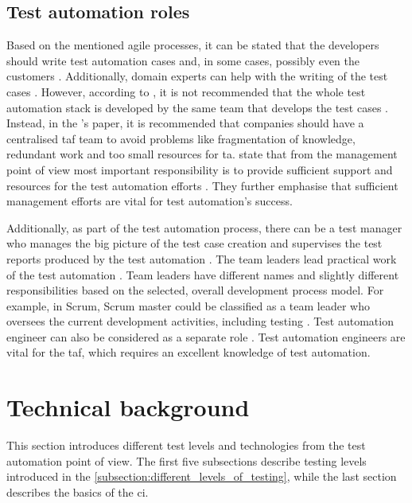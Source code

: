 \subsection{Test automation roles}\label{subsection:test_automation_roles}
Based on the mentioned agile processes, it can be stated that the developers should write test automation cases and, in some cases, possibly even the customers \cite{rubin2012essential, beck2000extreme}. Additionally, domain experts can help with the writing of the test cases \cite{winkler2018towards}. However, according to \citeauthor{ieshin2009test}, it is not recommended that the whole test automation stack is developed by the same team that develops the test cases \cite{ieshin2009test}. Instead, in the \citeauthor{ieshin2009test}'s paper, it is recommended that companies should have a centralised \gls{taf} team to avoid problems like fragmentation of knowledge, redundant work and too small resources for \gls{ta}. \citeauthor{graham2012experiences} state that from the management point of view most important responsibility is to provide sufficient support and resources for the test automation efforts \cite{graham2012experiences}. They further emphasise that sufficient management efforts are vital for test automation's success.

Additionally, as part of the test automation process, there can be a test manager who manages the big picture of the test case creation and supervises the test reports produced by the test automation \cite{winkler2018towards}. The team leaders lead practical work of the test automation \cite{pol2002software}. Team leaders have different names and slightly different responsibilities based on the selected, overall development process model. For example, in Scrum, Scrum master could be classified as a team leader who oversees the current development activities, including testing \cite{rubin2012essential}. Test automation engineer can also be considered as a separate role \cite{pol2002software}. Test automation engineers are vital for the \gls{taf}, which requires an excellent knowledge of test automation.

\section{Technical background}\label{section:technical_background}
This section introduces different test levels and technologies from the test automation point of view. The first five subsections describe testing levels introduced in the \autoref{subsection:different_levels_of_testing}, while the last section describes the basics of the \gls{ci}.

